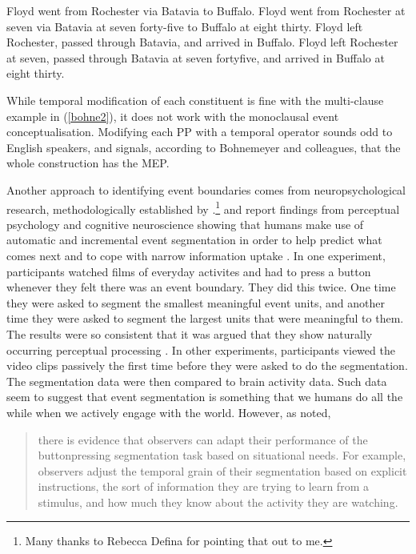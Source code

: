 \ea
\ea
\label{bohne1} Floyd went from Rochester via Batavia to Buffalo.
\ex *Floyd went from Rochester at seven via Batavia at seven forty-five to Buffalo at eight thirty.
\ex \label{bohne2} Floyd left Rochester, passed through Batavia, and arrived in Buffalo.
\ex Floyd left Rochester at seven, passed through Batavia at seven fortyfive, and arrived in Buffalo at eight thirty.
\z
\z

While temporal modification of each constituent is fine with the multi-clause example in (\ref{bohne2}), it does not work with the monoclausal event conceptualisation. Modifying each PP with a temporal operator sounds odd to English speakers, and signals, according to Bohnemeyer and colleagues, that the whole construction has the MEP.

Another approach to identifying event boundaries comes from neuropsychological research, methodologically established by \textcite{newtson1976perceptual}.\footnote{Many thanks to Rebecca Defina for pointing that out to me.} \textcite{zacks2007event} and \textcite{zacks2010we} report findings from perceptual psychology and cognitive neuroscience showing that humans make use of automatic and incremental event segmentation in order to help predict what comes next and to cope with narrow information uptake \citep{zacks2010we}. In one experiment, participants watched films of everyday activites and had to press a button whenever they felt there was an event boundary. They did this twice. One time they were asked to segment the smallest meaningful event units, and another time they were asked to segment the largest units that were meaningful to them. The results were so consistent that it was argued that they show naturally occurring perceptual processing \citep[80]{zacks2007event}. In other experiments, participants viewed the video clips passively the first time before they were asked to do the segmentation. The segmentation data were then compared to brain activity data. Such data seem to suggest that event segmentation is something that we humans do all the while when we actively engage with the world. However, as \citet[81]{zacks2007event} noted, 

\begin{quote}there is evidence
that observers can adapt their performance of the buttonpressing
segmentation task based on situational needs. For
example, observers adjust the temporal grain of their segmentation
based on explicit instructions, the sort of information they
are trying to learn from a stimulus, and how much they know
about the activity they are watching.\end{quote}

